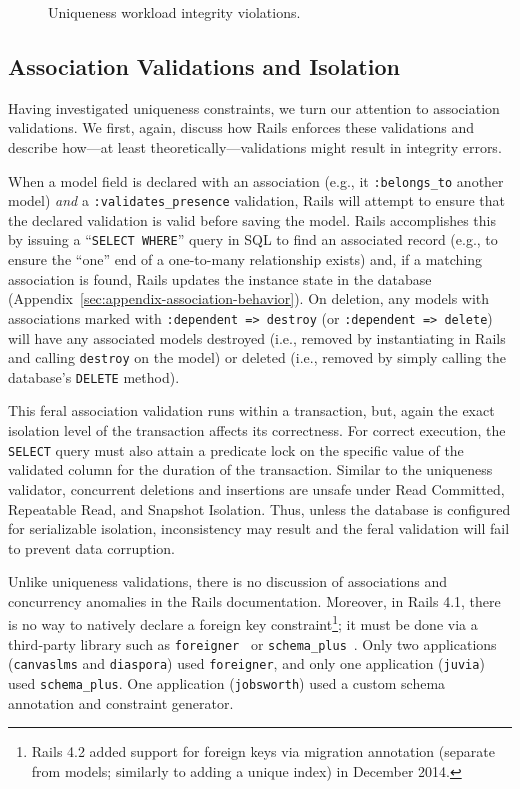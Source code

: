 \begin{figure}
\begin{minipage}{\columnwidth}
\end{minipage}
\caption{Uniqueness workload integrity violations.}
\label{fig:pk-workload}
\end{figure}

\subsection{Association Validations and Isolation}

Having investigated uniqueness constraints, we turn our attention to
association validations. We first, again, discuss how Rails enforces
these validations and describe how---at least
theoretically---validations might result in integrity errors.

When a model field is declared with an association (e.g., it
\texttt{:belongs\_to} another model) \textit{and} a
\texttt{:validates\_presence} validation, Rails will attempt to ensure
that the declared validation is valid before saving the model. Rails
accomplishes this by issuing a ``\texttt{SELECT WHERE}'' query in SQL
to find an associated record (e.g., to ensure the ``one'' end of a
one-to-many relationship exists) and, if a matching association is
found, Rails updates the instance state in the database
(Appendix~\ref{sec:appendix-association-behavior}). On deletion, any
models with associations marked with \texttt{:dependent => destroy}
(or \texttt{:dependent => delete}) will have any associated models
destroyed (i.e., removed by instantiating in Rails and calling
\texttt{destroy} on the model) or deleted (i.e., removed by simply
calling the database's \texttt{DELETE} method).

This feral association validation runs within a transaction, but,
again the exact isolation level of the transaction affects its
correctness. For correct execution, the \texttt{SELECT} query must
also attain a predicate lock on the specific value of the validated
column for the duration of the transaction. Similar to the uniqueness
validator, concurrent deletions and insertions are unsafe under Read
Committed, Repeatable Read, and Snapshot Isolation. Thus, unless the
database is configured for serializable isolation, inconsistency may
result and the feral validation will fail to prevent data corruption.

Unlike uniqueness validations, there is no discussion of associations
and concurrency anomalies in the Rails documentation. Moreover, in
Rails 4.1, there is no way to natively declare a foreign key
constraint\footnote{Rails 4.2 added support for foreign keys via
  migration annotation (separate from models; similarly to adding a
  unique index) in December 2014.}; it must be done via a third-party
library such as \texttt{foreigner}~\cite{foreigner} or
\texttt{schema\_plus}~\cite{schemaplus}. Only two applications
(\texttt{canvaslms} and \texttt{diaspora}) used \texttt{foreigner},
and only one application (\texttt{juvia}) used
\texttt{schema\_plus}. One application (\texttt{jobsworth}) used a
custom schema annotation and constraint generator.

